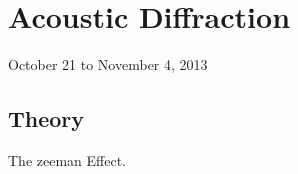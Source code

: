 \chapter{Acoustic Diffraction}
\begin{flushright}
October 21 to November 4, 2013 \\
\end{flushright}

\section{Theory}
The zeeman Effect.